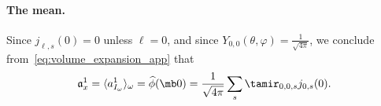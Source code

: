 \documentclass[9pt,twocolumn,twoside,lineno]{pnas-new}
\begin{document}
\paragraph{The mean.}

Since $j_{\ell,s}(0) = 0$ unless $\ell=0$, and since
$Y_{0,0}(\theta,\varphi) = \frac{1}{\sqrt{4\pi}}$, we conclude from~\eqref{eq:volume_expansion_app} that
\begin{equation} \label{eq:ac_1_prolates}
\mathfrak{a}_x^1 = \langle
a^1_{I_{\omega}}\rangle_{\omega}  = \widehat  \phi(\mb 0) = \frac{1}{\sqrt{4\pi}}\sum_s\tamir_{0,0,s}j_{0,s}(0).
\end{equation}



\end{document}
